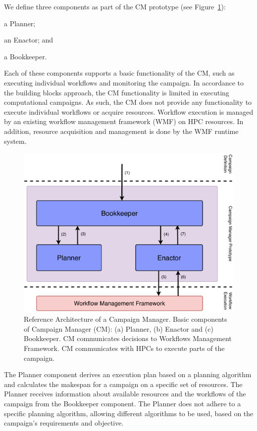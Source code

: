 We define three components as part of the CM prototype (see
Figure~\ref{fig:refarch}):
\begin{inparaenum}[(1)]
    \item a Planner;
    \item an Enactor; and
    \item a Bookkeeper.
\end{inparaenum}
Each of these components supports a basic functionality of the CM, such as 
executing individual workflows and monitoring the campaign. In accordance to 
the building blocks approach, the CM functionality is limited in executing 
computational campaigns. As such, the CM does not provide any functionality to 
execute individual workflows or acquire resources. Workflow execution is 
managed by an existing workflow management framework (WMF) on HPC resources. In 
addition, resource acquisition and management is done by the WMF runtime system.

\begin{figure}[t]
    \centering
    \includegraphics[width=.75\textwidth]{figures/manager/CEM_design.pdf}
    \caption{Reference Architecture of a Campaign Manager. Basic components of
        Campaign Manager (CM): (a) Planner, (b) Enactor and (c) Bookkeeper. CM
        communicates decisions to Workflows Management Framework. CM
        communicates with HPCs to execute parts of the
        campaign.}\label{fig:refarch}
\end{figure}

The Planner component derives an execution plan based on a planning algorithm
and calculates the makespan for a campaign on a specific set of resources. The
Planner receives information about available resources and the workflows of the
campaign from the Bookkeeper component. The Planner does not adhere to a
specific planning algorithm, allowing different algorithms to be used, based on
the campaign's requirements and objective.

